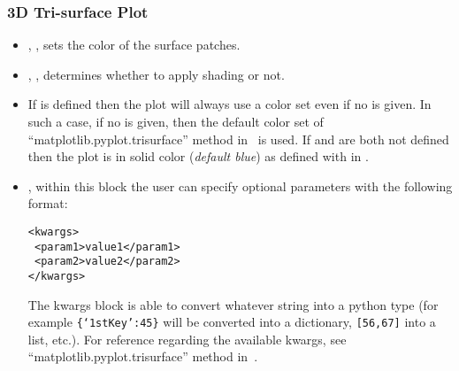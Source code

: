 \subsubsection{3D Tri-surface Plot}
\begin{itemize}
  \item {}, , sets the color of the
  surface patches.
  \item {}, , determines whether
  to apply shading or not.
  \item {}
  \nb If  is defined then the plot will always use a color set even if no  is given.
  In such a case, if no  is given, then the default color set of  ``matplotlib.pyplot.trisurface'' method in~\cite{MatPlotLib} is used.
  If  and  are both not defined then the plot is in solid color (\textit{default blue}) as defined with  in   .
  \item {}, within this block the user can specify optional
  parameters with the following format:

\begin{lstlisting}[style=XML]
<kwargs>
 <param1>value1</param1>
 <param2>value2</param2>
</kwargs>
\end{lstlisting}

  The kwargs block is able to convert whatever string into a python type (for
  example  \texttt{\{`1stKey':45\}} will
  be converted into a dictionary,
   \texttt{[56,67]}  into a list, etc.).
  For reference regarding the available kwargs, see
  ``matplotlib.pyplot.trisurface'' method in~\cite{MatPlotLib}.
\end{itemize}

